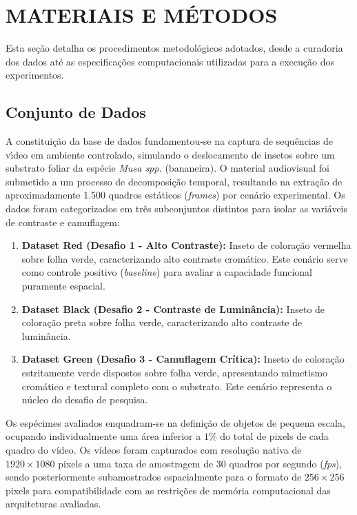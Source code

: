 \chapter{MATERIAIS E MÉTODOS}
\label{cap:materiais_e_metodos}

Esta seção detalha os procedimentos metodológicos adotados, desde a curadoria dos dados até as especificações computacionais utilizadas para a execução dos experimentos.

\section{Conjunto de Dados}
\label{sec:dataset}

A constituição da base de dados fundamentou-se na captura de sequências de vı́deo em ambiente controlado, simulando o deslocamento de insetos sobre um substrato foliar da esp\'ecie \textit{Musa spp.} (bananeira). O material audiovisual foi submetido a um processo de decomposição temporal, resultando na extração de aproximadamente 1.500 quadros estáticos (\textit{frames}) por cenário experimental. Os dados foram categorizados em três subconjuntos distintos para isolar as variáveis de contraste e camuflagem:

\begin{enumerate}
    \item \textbf{Dataset Red (Desafio 1 - Alto Contraste):} Inseto de coloração vermelha sobre folha verde, caracterizando alto contraste cromático. Este cenário serve como controle positivo (\textit{baseline}) para avaliar a capacidade funcional puramente espacial.
    \item \textbf{Dataset Black (Desafio 2 - Contraste de Luminância):} Inseto de coloração preta sobre folha verde, caracterizando alto contraste de luminância.
    \item \textbf{Dataset Green (Desafio 3 - Camuflagem Crítica):} Inseto de coloração estritamente verde dispostos sobre folha verde, apresentando mimetismo cromático e textural completo com o substrato. Este cenário representa o núcleo do desafio de pesquisa.
\end{enumerate}

Os espécimes avaliados enquadram-se na definição de objetos de pequena escala, ocupando individualmente uma área inferior a $1\%$ do total de pixels de cada quadro do vídeo. Os vídeos foram capturados com resolução nativa de $1920 \times 1080$ pixels a uma taxa de amostragem de 30 quadros por segundo (\textit{fps}), sendo posteriormente subamostrados espacialmente para o formato de $256 \times 256$ pixels para compatibilidade com as restrições de memória computacional das arquiteturas avaliadas.

